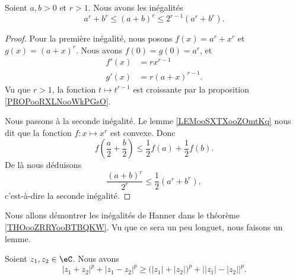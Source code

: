 	\begin{lemma}       \label{LEMooFKKEooDTypUd}
		Soient \( a,b>0\) et \( r>1\). Nous avons les inégalités
		\begin{equation}
			a^r+b^r\leq (a+b)^r\leq 2^{r-1}(a^r+b^r).
		\end{equation}
	\end{lemma}

	\begin{proof}
		Pour la première inégalité, nous posons \( f(x)=a^r+x^r\) et \( g(x)=(a+x)^r\). Nous avons \( f(0)=g(0)=a^r\), et
		\begin{subequations}
			\begin{align}
				f'(x) & =rx^{r-1}      \\
				g'(x) & =r(a+x)^{r-1}.
			\end{align}
		\end{subequations}
		Vu que \( r>1\), la fonction \( t\mapsto t^{r-1}\) est croissante par la proposition \ref{PROPooRXLNooWkPGsO}.

		Nous passons à la seconde inégalité. Le lemme \ref{LEMooSXTXooZOmtKq} nous dit que la fonction \( f\colon x\mapsto x^r \) est convexe. Donc
		\begin{equation}
			f\left( \frac{ a }{2}+\frac{ b }{2} \right)\leq\frac{ 1 }{2}f(a)+\frac{ 1 }{2}f(b).
		\end{equation}
		De là nous déduisons
		\begin{equation}
			\frac{ (a+b)^r }{ 2^r }\leq \frac{ 1 }{2}(a^r+b^r),
		\end{equation}
		c'est-à-dire la seconde inégalité.
	\end{proof}

	Nous allons démontrer les inégalités de Hanner dans le théorème \ref{THOooZRRYooBTBQKW}. Vu que ce sera un peu longuet, nous faisons un lemme.
	\begin{lemma}       \label{LEMooDHRCooQiSpyC}
		Soient \( z_1,z_2\in \eC\). Nous avons
		\begin{equation}        \label{EQooMUXVooSpGSyG}
			| z_1+z_2 |^p+| z_1-z_2 |^p\geq \big( | z_1 |+| z_2 | \big)^p+\big| | z_1 |-| z_2 | \big|^p.
		\end{equation}
	\end{lemma}

